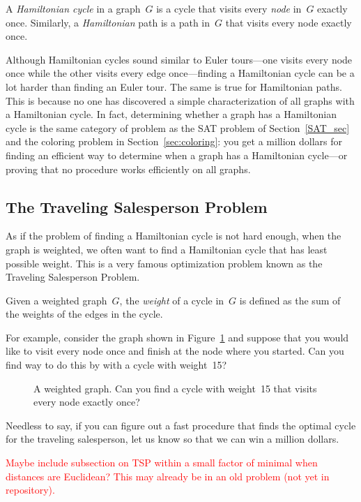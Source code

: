 \begin{editingnotes}
\begin{definition}\label{def:hamiltonian-cycle}
A \emph{Hamiltonian cycle} in a graph~$G$ is a cycle that visits every
\emph{node} in~$G$ exactly once.  Similarly, a \emph{Hamiltonian} path
is a path in~$G$ that visits every node exactly once.
\end{definition}

Although Hamiltonian cycles sound similar to Euler tours---one visits
every node once while the other visits every edge once---finding a
Hamiltonian cycle can be a lot harder than finding an Euler tour.  The
same is true for Hamiltonian paths.  This is because no one has
discovered a simple characterization of all graphs with a Hamiltonian
cycle.  In fact, determining whether a graph has a Hamiltonian cycle
is the same category of problem as the SAT problem of
Section~\ref{SAT_sec} and the coloring problem in
Section~\ref{sec:coloring}: you get a million dollars for finding an
efficient way to determine when a graph has a Hamiltonian cycle---or
proving that no procedure works efficiently on all graphs.

\subsection{The Traveling Salesperson Problem}

As if the problem of finding a Hamiltonian cycle is not hard enough,
when the graph is weighted, we often want to find a Hamiltonian cycle
that has least possible weight.  This is a very famous optimization
problem known as the Traveling Salesperson Problem.

\begin{definition}
Given a weighted graph~$G$, the \emph{weight} of a cycle in~$G$ is
defined as the sum of the weights of the edges in the cycle.
\end{definition}

For example, consider the graph shown in Figure~\ref{fig:5AL} and
suppose that you would like to visit every node once and finish at the
node where you started.  Can you find  way to do this by with a
cycle with weight~15?

\begin{figure}


\caption{A weighted graph.  Can you find a cycle with weight~15 that
  visits every node exactly once?}

\label{fig:5AL}
\end{figure}

Needless to say, if you can figure out a fast procedure that finds the
optimal cycle for the traveling salesperson, let us know so that we
can win a million dollars.

\textcolor{red}{Maybe include subsection on TSP within a small factor
  of minimal when distances are Euclidean?  This may already be in an
  old problem (not yet in repository).}
\end{editingnotes}



